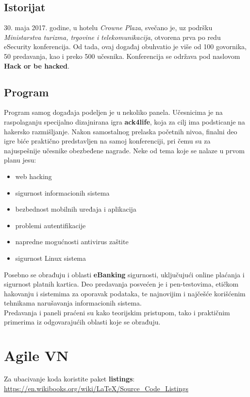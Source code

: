 \documentclass[a4paper]{article}
\begin{document}
\subsection{Istorijat}
30. maja 2017. godine, u hotelu \textit{Crowne Plaza}, svečano je, uz podršku \textit{Ministarstva turizma, trgovine i telekomunikacija}, otvorena prva po redu eSecurity konferencija. \newline Od tada, ovaj događaj obuhvatio je više od 100 govornika, 50 predavanja, kao i preko 500 učesnika.
Konferencija se održava pod naslovom \textbf{Hack or be hacked}.
\subsection{Program}
Program samog događaja podeljen je u nekoliko panela. Učesnicima je na raspolaganju specijalno dizajnirana igra \textbf{ack4life}, koja za cilj ima podsticanje na hakersko razmišljanje. Nakon samostalnog prelaska početnih nivoa, finalni deo igre biće praktično predstavljen na samoj konferenciji, pri čemu su za najuspešnije učesnike obezbeđene nagrade.
\newline
Neke od tema koje se nalaze u prvom planu jesu:
\begin{itemize}
    \item web hacking
    \item sigurnost informacionih sistema
    \item bezbednost mobilnih uređaja i aplikacija
    \item problemi autentifikacije
    \item napredne mogućnosti antivirus zaštite
    \item sigurnost Linux sistema
\end{itemize}
Posebno se obrađuju i oblasti \textbf{eBanking} sigurnosti, uključujući online plaćanja i sigurnost platnih kartica. Deo predavanja posvećen je i pen-testovima, etičkom hakovanju i sistemima za oporavak podataka, te najnovijim i najčešće korišćenim tehnikama narušavanja informacionih sistema.
\\
Predavanja i paneli praćeni su kako teorijskim pristupom, tako i praktičnim primerima iz odgovarajućih oblasti koje se obrađuju.

\section{Agile VN}
Za ubacivanje koda koristite paket \textbf{listings}:
\url{https://en.wikibooks.org/wiki/LaTeX/Source_Code_Listings}
\end{document}
